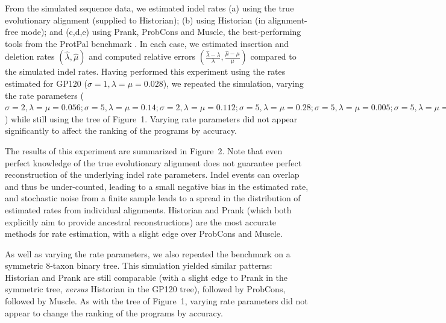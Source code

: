 \documentclass{bioinfo}
\begin{document}
From the simulated sequence data, we estimated indel rates
(a) using the true evolutionary alignment (supplied to Historian);
(b) using Historian (in alignment-free mode);
and
(c,d,e) using Prank, ProbCons and Muscle,
the best-performing tools from the ProtPal benchmark \citep{Westesson2012-zg}.
In each case, we estimated insertion and deletion rates $(\hat{\lambda},\hat{\mu})$ and computed relative errors $(\frac{\hat{\lambda}-\lambda}{\lambda},\frac{\hat{\mu}-\mu}{\mu})$
compared to the simulated indel rates.
Having performed this experiment
using the rates estimated for GP120 ($\sigma=1,\lambda=\mu=0.028$),
we repeated the simulation, varying the rate parameters
($\sigma=2,\lambda=\mu=0.056;
\sigma=5,\lambda=\mu=0.14;
\sigma=2,\lambda=\mu=0.112;
\sigma=5,\lambda=\mu=0.28;
\sigma=5,\lambda=\mu=0.005;
\sigma=5,\lambda=\mu=0.01$)
while still using the tree of Figure~1.
Varying rate parameters did not appear
significantly to affect the ranking of the programs by accuracy.

The results of this experiment are summarized in Figure~2.
Note that even perfect knowledge of the true evolutionary alignment does not guarantee perfect reconstruction of the underlying indel rate parameters.
Indel events can overlap and thus be under-counted,
leading to a small negative bias in the estimated rate,
and stochastic noise from a finite sample leads to a spread in the distribution
of estimated rates from individual alignments.
Historian and Prank (which both explicitly aim to provide ancestral reconstructions)
are the most accurate methods for rate estimation,
with a slight edge over ProbCons and Muscle.

As well as varying the rate parameters,
we also repeated the benchmark on a symmetric 8-taxon binary tree.
This simulation yielded similar patterns:
Historian and Prank are still comparable (with a slight edge to Prank in the
symmetric tree, {\em versus} Historian in the GP120 tree),
followed by ProbCons, followed by Muscle.
As with the tree of Figure~1,
varying rate parameters did not appear to change the ranking of the programs by accuracy.
\end{document}
